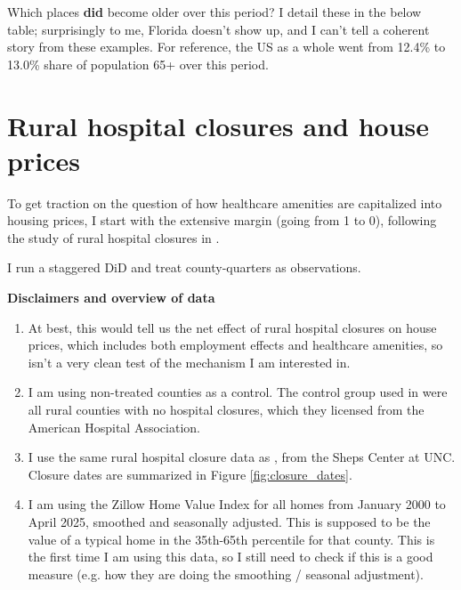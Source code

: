 \documentclass[11pt]{article}
\begin{document}

Which places \textbf{did} become older over this period?  I detail these in the below table; surprisingly to me, Florida doesn't show up, and I can't tell a coherent story from these examples.  For reference, the US as a whole went from 12.4\% to 13.0\% share of population 65+ over this period.




\newpage
\section{Rural hospital closures and house prices}

To get traction on the question of how healthcare amenities are capitalized into housing prices, I start with the extensive margin (going from 1 to 0), following the study of rural hospital closures in \citep{AlexanderRichards2023}.

 I run a staggered DiD and
treat county-quarters as observations. 



\textbf{Disclaimers and overview of data}
\begin{enumerate}
    \item At best, this would tell us the net effect of rural hospital closures on house prices, which includes both employment effects and healthcare amenities, so isn't a very clean test of the mechanism I am interested in. 
\item I am using non-treated counties as a control. The control group used in \citep{AlexanderRichards2023} were all rural counties with no hospital closures, which they licensed from the American Hospital Association.
\item I use the same rural hospital closure data as \citep{AlexanderRichards2023}, from the Sheps Center at UNC. Closure dates are summarized in Figure \ref{fig:closure_dates}.

\item I am using the Zillow Home Value Index for all homes from January 2000 to April 2025, smoothed and seasonally adjusted. This is supposed to be the value of a typical home in the 35th-65th percentile for that county. This is the first time I am using this data, so I still need to check if this is a good measure (e.g. how they are doing the smoothing / seasonal adjustment). 
\end{enumerate}
\end{document}

